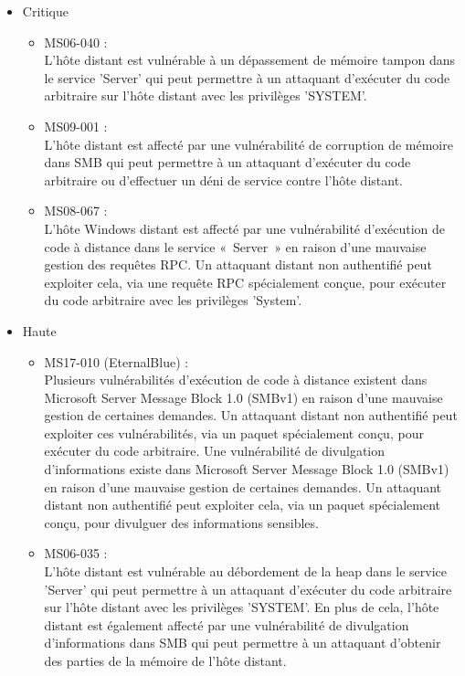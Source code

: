\documentclass[a4paper]{article}
\begin{document}
\begin{itemize}
    \item Critique
    \begin{itemize}
        \item MS06-040 :\\
        L'hôte distant est vulnérable à un dépassement de mémoire tampon dans le service 'Server' qui peut permettre à un attaquant d'exécuter du code arbitraire sur l'hôte distant avec les privilèges 'SYSTEM'.
        \item MS09-001 :\\
        L'hôte distant est affecté par une vulnérabilité de corruption de mémoire dans SMB qui peut permettre à un attaquant d'exécuter du code arbitraire ou d'effectuer un déni de service contre l'hôte distant.
        \item MS08-067 :\\
        L'hôte Windows distant est affecté par une vulnérabilité d'exécution de code à distance dans le service « Server » en raison d'une mauvaise gestion des requêtes RPC. Un attaquant distant non authentifié peut exploiter cela, via une requête RPC spécialement conçue, pour exécuter du code arbitraire avec les privilèges 'System'.
    \end{itemize}
    \item Haute
    \begin{itemize}
        \item MS17-010 (EternalBlue) :\\
        Plusieurs vulnérabilités d'exécution de code à distance existent dans Microsoft Server Message Block 1.0 (SMBv1) en raison d'une mauvaise gestion de certaines demandes. Un attaquant distant non authentifié peut exploiter ces vulnérabilités, via un paquet spécialement conçu, pour exécuter du code arbitraire. Une vulnérabilité de divulgation d'informations existe dans Microsoft Server Message Block 1.0 (SMBv1) en raison d'une mauvaise gestion de certaines demandes. Un attaquant distant non authentifié peut exploiter cela, via un paquet spécialement conçu, pour divulguer des informations sensibles. 
        \item MS06-035 :\\
        L'hôte distant est vulnérable au débordement de la heap dans le service 'Server' qui peut permettre à un attaquant d'exécuter du code arbitraire sur l'hôte distant avec les privilèges 'SYSTEM'. En plus de cela, l'hôte distant est également affecté par une vulnérabilité de divulgation d'informations dans SMB qui peut permettre à un attaquant d'obtenir des parties de la mémoire de l'hôte distant. 

\end{itemize}
\end{itemize}
\end{document}
